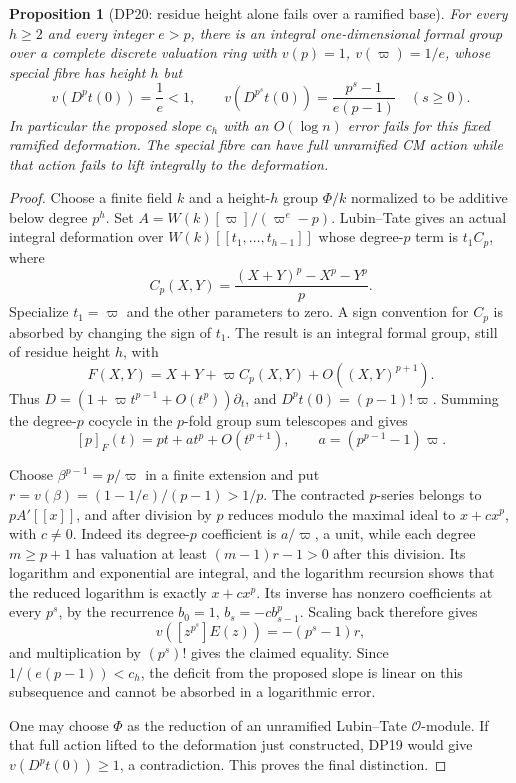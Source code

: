 \documentclass[11pt,a4paper]{article}
\newtheorem{proposition}[theorem]{Proposition}
\theoremstyle{definition}\newtheorem{remark}[theorem]{Remark}
\begin{document}
\begin{proposition}[DP20: residue height alone fails over a ramified base]\label{DP20}
For every $h\ge2$ and every integer $e>p$, there is an integral one-dimensional formal group over a complete discrete valuation ring with $v(p)=1$, $v(\varpi)=1/e$, whose special fibre has height $h$ but
\[
 v(D^pt(0))=\frac1e<1,
 \qquad
 v(D^{p^s}t(0))=\frac{p^s-1}{e(p-1)}\quad(s\ge0).
\]
In particular the proposed slope $c_h$ with an $O(\log n)$ error fails for this fixed ramified deformation. The special fibre can have full unramified CM action while that action fails to lift integrally to the deformation.
\end{proposition}
\begin{proof}
Choose a finite field $k$ and a height-$h$ group $\Phi/k$ normalized to be additive below degree $p^h$. Set $A=W(k)[\varpi]/(\varpi^e-p)$. Lubin--Tate \cite[Proposition 1.1, pp.~50--51]{LT66} gives an actual integral deformation over $W(k)[[t_1,\ldots,t_{h-1}]]$ whose degree-$p$ term is $t_1C_p$, where
\[
 C_p(X,Y)=\frac{(X+Y)^p-X^p-Y^p}{p}.
\]
Specialize $t_1=\varpi$ and the other parameters to zero. A sign convention for $C_p$ is absorbed by changing the sign of $t_1$. The result is an integral formal group, still of residue height $h$, with
\[
 F(X,Y)=X+Y+\varpi C_p(X,Y)+O((X,Y)^{p+1}).
\]
Thus $D=(1+\varpi t^{p-1}+O(t^p))\partial_t$, and $D^pt(0)=(p-1)!\varpi$. Summing the degree-$p$ cocycle in the $p$-fold group sum telescopes and gives
\[
 [p]_F(t)=pt+a t^p+O(t^{p+1}),\qquad
 a=(p^{p-1}-1)\varpi.
\]

Choose $\beta^{p-1}=p/\varpi$ in a finite extension and put $r=v(\beta)=(1-1/e)/(p-1)>1/p$. The contracted $p$-series belongs to $pA'[[x]]$, and after division by $p$ reduces modulo the maximal ideal to $x+cx^p$, with $c\ne0$. Indeed its degree-$p$ coefficient is $a/\varpi$, a unit, while each degree $m\ge p+1$ has valuation at least $(m-1)r-1>0$ after this division. Its logarithm and exponential are integral, and the logarithm recursion shows that the reduced logarithm is exactly $x+cx^p$. Its inverse has nonzero coefficients at every $p^s$, by the recurrence $b_0=1$, $b_s=-cb_{s-1}^p$. Scaling back therefore gives
\[
 v([z^{p^s}]E(z))=-(p^s-1)r,
\]
and multiplication by $(p^s)!$ gives the claimed equality. Since $1/(e(p-1))<c_h$, the deficit from the proposed slope is linear on this subsequence and cannot be absorbed in a logarithmic error.

One may choose $\Phi$ as the reduction of an unramified Lubin--Tate $\mathcal O$-module. If that full action lifted to the deformation just constructed, DP19 would give $v(D^pt(0))\ge1$, a contradiction. This proves the final distinction.
\end{proof}
\end{document}
